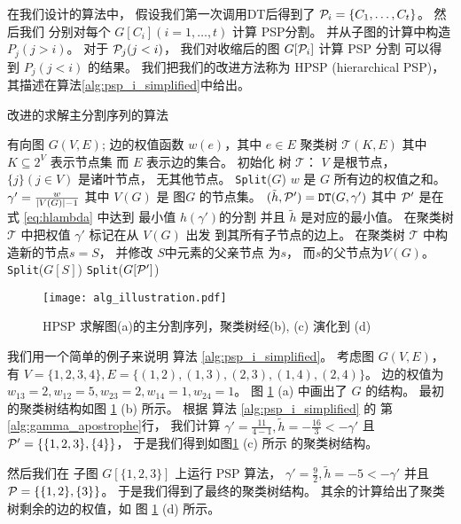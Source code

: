 在我们设计的算法中，
假设我们第一次调用DT后得到了
$\P_i = \{C_1, \dots, C_t\}$。
然后我们 分别对每个
$G[C_i](i=1,\dots, t)$
计算 PSP分割。
并从子图的计算中构造 $P_j(j>i)$。
对于 $\P_j(j<i)$，
我们对收缩后的图 $G[\P_i]$ 计算 PSP 分割
可以得到  $P_j(j<i)$ 的结果。
我们把我们的改进方法称为 HPSP (hierarchical PSP)，
其描述在算法\ref{alg:psp_i_simplified}中给出。

\begin{algorithm}[!ht]
	\caption{改进的求解主分割序列的算法}\label{alg:psp_i_simplified}
	\begin{algorithmic}[1]
		\REQUIRE 有向图 $G(V, E)$; 边的权值函数 $w(e)$，其中 $e\in E$
		\ENSURE 聚类树 $\mathcal{T}(K, E)$ 其中 $K \subseteq 2^{V}$ 表示节点集
    而 $E$ 表示边的集合。
		\STATE 初始化 树 $\mathcal{T}$：
     $V$ 是根节点，
     $\{j\}(j \in V)$ 是诸叶节点，
     无其他节点。
		\STATE \texttt{Split}($G$)
		\STATE $w$ 是 $G$ 所有边的权值之和。
		\STATE $\gamma' = \frac{w}{\abs{V(G)}-1}$
    其中 $V(G)$ 是 图$G$
    的节点集。
    \label{alg:gamma_apostrophe}
		\STATE $(\tilde{h}, \P')
    = \texttt{DT}(G, \gamma')$ 其中
    $\P'$ 是在 式 \eqref{eq:hlambda} 中达到
    最小值 $h(\gamma')$的分割
    并且 $\tilde{h}$ 是对应的最小值。 \label{line:DT}
		\STATE 在聚类树
    $\mathcal{T}$ 中把权值 $\gamma'$ 标记在从 $V(G)$ 出发
    到其所有子节点的边上。
		\ELSE
		\STATE 在聚类树
    $\mathcal{T}$ 中构造新的节点$s=S$，
    并修改 $S$中元素的父亲节点 为$s$，
    而$s$的父节点为$V(G)$。
		\STATE \texttt{Split}($G[S]$) \label{line:SplitDown}
		\ENDFOR 
		\STATE \texttt{Split}($G[\P']$)		\label{line:SplitUp}
		\ENDIF
		\ENDFUNCTION
	\end{algorithmic}
\end{algorithm}

\begin{figure}[!ht]
	\centering
	\texttt{[image: alg\_illustration.pdf]}
	\caption{HPSP 求解图(a)的主分割序列，聚类树经(b), (c) 演化到 (d) }\label{fig:alg_eg}
\end{figure}

\begin{example}
	我们用一个简单的例子来说明
  算法 \ref{alg:psp_i_simplified}。
  考虑图 $G(V, E)$，有 $V=\{1,2,3,4\}, E=\{(1,2),(1,3),(2,3),(1,4),(2,4)\}$。
  边的权值为 $w_{13}=2, w_{12}=5, w_{23}=2, w_{14}=1, w_{24}=1$。
	图 \ref{fig:alg_eg} (a) 中画出了 $G$
  的结构。
  最初的聚类树结构如图 \ref{fig:alg_eg} (b)
  所示。
  根据 
  算法 \ref{alg:psp_i_simplified} 的
  第\ref {alg:gamma_apostrophe}行，
  我们计算 $\gamma' = \frac{11}{4-1}, \tilde{h} = -\frac{16}{3} < -\gamma' $
  且 $\P' = \{\{1,2,3\},\{4\}\}$，
  于是我们得到如图\ref{fig:alg_eg} (c) 所示
  的聚类树结构。
	
	然后我们在 子图 $G[\{1,2,3\}]$ 上运行 PSP 算法，
  $\gamma' = \frac{9}{2}, \tilde{h} = -5 < -\gamma'$
  并且 $\P= \{\{1,2\},\{3\}\}$。 
  于是我们得到了最终的聚类树结构。
  其余的计算给出了聚类树剩余的边的权值，如
  图 \ref{fig:alg_eg} (d) 所示。
\end{example}	
